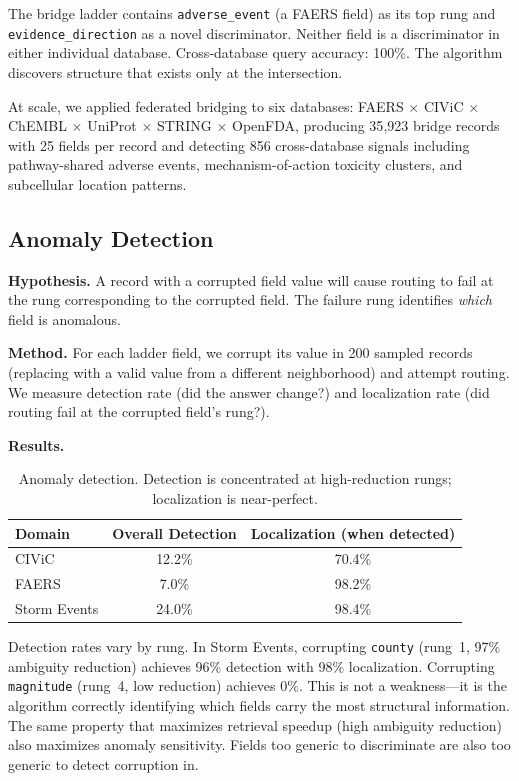 \documentclass[11pt]{article}
\begin{document}
The bridge ladder contains \texttt{adverse\_event} (a FAERS field) as its top rung and \texttt{evidence\_direction} as a novel discriminator. Neither field is a discriminator in either individual database. Cross-database query accuracy: 100\%. The algorithm discovers structure that exists only at the intersection.

At scale, we applied federated bridging to six databases: FAERS $\times$ CIViC $\times$ ChEMBL $\times$ UniProt $\times$ STRING $\times$ OpenFDA, producing 35{,}923 bridge records with 25 fields per record and detecting 856 cross-database signals including pathway-shared adverse events, mechanism-of-action toxicity clusters, and subcellular location patterns.

\subsection{Anomaly Detection}

\textbf{Hypothesis.} A record with a corrupted field value will cause routing to fail at the rung corresponding to the corrupted field. The failure rung identifies \textit{which} field is anomalous.

\textbf{Method.} For each ladder field, we corrupt its value in 200 sampled records (replacing with a valid value from a different neighborhood) and attempt routing. We measure detection rate (did the answer change?) and localization rate (did routing fail at the corrupted field's rung?).

\textbf{Results.}

\begin{table}[h]
\centering
\begin{tabular}{lcc}
\toprule
Domain & Overall Detection & Localization (when detected) \\
\midrule
CIViC & 12.2\% & 70.4\% \\
FAERS & 7.0\% & 98.2\% \\
Storm Events & 24.0\% & 98.4\% \\
\bottomrule
\end{tabular}
\caption{Anomaly detection. Detection is concentrated at high-reduction rungs; localization is near-perfect.}
\label{tab:anomaly}
\end{table}

Detection rates vary by rung. In Storm Events, corrupting \texttt{county} (rung~1, 97\% ambiguity reduction) achieves 96\% detection with 98\% localization. Corrupting \texttt{magnitude} (rung~4, low reduction) achieves 0\%. This is not a weakness---it is the algorithm correctly identifying which fields carry the most structural information. The same property that maximizes retrieval speedup (high ambiguity reduction) also maximizes anomaly sensitivity. Fields too generic to discriminate are also too generic to detect corruption in.
\end{document}
